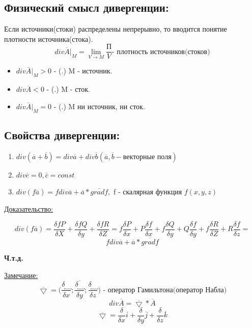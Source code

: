 \documentclass[12pt]{article}
\let\oldlim\lim
\renewcommand{\lim}{\oldlim\limits}
\begin{document}
  \subsection*{Физический смысл дивергенции:}
  Если источники(стоки) распределены непрерывно, то вводится понятие плотности источника(стока).
  \[div \overline{A}\Big|_M = \lim_{V \to M} \frac{\text{П}}{V} \text{- плотность источников(стоков)}\]
  \begin{itemize}
    \item $div \overline{A}\Big|_M >0$ - (.) M - источник.
    \item $div \overline{A}<0$ - (.) M - сток.
    \item $div\overline{A}\Big|_M = 0$ - (.) M ни источник, ни сток.
  \end{itemize}
  \subsection*{Свойства дивергенции:}
  \begin{enumerate}
    \item $div(\overline{a}+\overline{b})=div\overline{a}+div\overline{b}(\overline{a},\overline{b} - \text{векторные поля})$
    \item $div \overline{c} = 0, \overline{c} = const$
    \item $div(f\overline{a}) = f div\overline{a}+\overline{a}*\overline{gradf},$ f - скалярная функция $f(x,y,z)$
  \end{enumerate}
  \underline{Доказательство:}
  \begin{adjustwidth}{1.5em}{1.5em}
    \[div(f\overline{a})=\frac{\delta fP}{\delta X}+\frac{\delta f Q}{\delta y}+\frac{\delta f R}{\delta Z}=
    f\frac{\delta P}{\delta x}+P\frac{\delta f}{\delta x}+f \frac{\delta Q}{\delta y}+Q\frac{\delta f}{\delta y}+
    f\frac{\delta R}{\delta Z}+R\frac{\delta f}{\delta z}=\]
    \[f div \overline{a}+\overline{a}*\overline{gradf}\]
  \end{adjustwidth}
  \begin{center}
    \textbf{Ч.т.д.}
  \end{center}
  \underline{Замечание:} 
  \[\overline{\bigtriangledown} = \Big(\overline{\frac{\delta \underbracket{\hspace{10pt}}}{\delta x}
  ;\frac{\delta \underbracket{\hspace{10pt}}}{\delta y};\frac{\delta \underbracket{\hspace{10pt}}}{\delta z}}\Big)
  \text{ - оператор Гамильтона(оператор Набла)}\]
  \[div \overline{A} = \overline{\bigtriangledown}*\overline{A}\]
  \[\overline{\bigtriangledown} = \frac{\delta}{\delta x}\overline{i}+
  \frac{\delta}{\delta y}\overline{j}+\frac{\delta}{\delta z}\overline{k}\]
\end{document}
